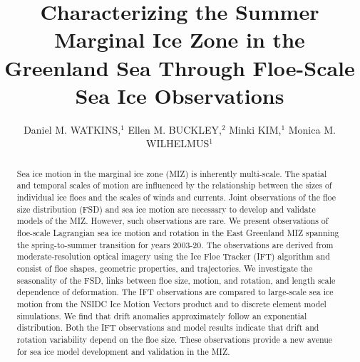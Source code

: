 \documentclass[aog]{igs}
\begin{document}
\title[Floe-scale sea ice motion]{Characterizing the Summer Marginal Ice Zone in the Greenland Sea Through Floe-Scale Sea Ice Observations}

\author[Watkins and others]{Daniel M. WATKINS,$^1$
  Ellen M. BUCKLEY,$^2$ Minki KIM,$^1$ 
  Monica M. WILHELMUS$^1$}


\begin{frontmatter}
\maketitle

\begin{abstract}
Sea ice motion in the marginal ice zone (MIZ) is inherently multi-scale. 
The spatial and temporal scales of motion are influenced by the relationship between the sizes of individual ice floes and the scales of winds and currents.
Joint observations of the floe size distribution (FSD) and sea ice motion are necessary to develop and validate models of the MIZ. 
However, such observations are rare.
We present observations of floe-scale Lagrangian sea ice motion and rotation in the East Greenland MIZ spanning the spring-to-summer transition for years 2003-20.
The observations are derived from moderate-resolution optical imagery using the Ice Floe Tracker (IFT) algorithm and consist of floe shapes, geometric properties, and trajectories.
We investigate the seasonality of the FSD, links between floe size, motion, and rotation, and length scale dependence of deformation. 
The IFT observations are compared to large-scale sea ice motion from the NSIDC Ice Motion Vectors product and to discrete element model simulations.
We find that drift anomalies approximately follow an exponential distribution. 
Both the IFT observations and model results indicate that drift and rotation variability depend on the floe size. 
These observations provide a new avenue for sea ice model development and validation in the MIZ.

\end{abstract}
\end{frontmatter}
\end{document}
